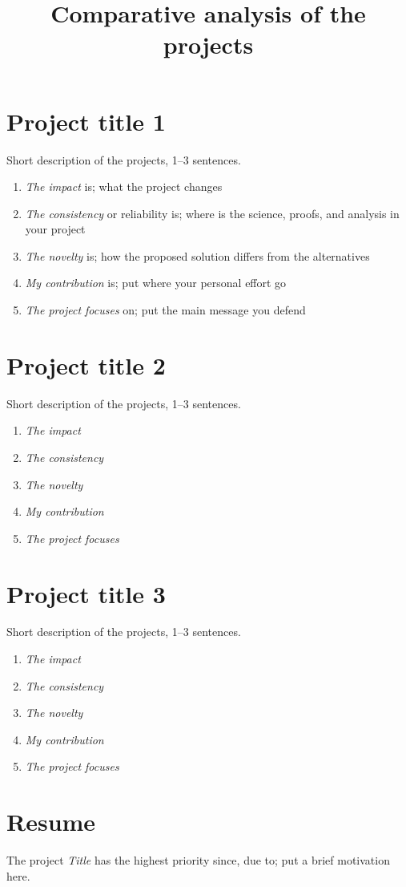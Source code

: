 \documentclass[12pt]{article}
\title{Comparative analysis of the projects}
\date{}
\begin{document}
\maketitle

\section{Project title 1}
Short description of the projects, 1--3 sentences. 
\begin{enumerate}
\item \emph{The impact} is; what the project changes 
\item \emph{The consistency} or reliability is; where is the science, proofs, and analysis in your project
\item \emph{The novelty} is; how the proposed solution differs from the alternatives
\item \emph{My contribution} is; put where your personal effort go
\item \emph{The project focuses} on; put the main message you defend
\end{enumerate}

\section{Project title 2}
Short description of the projects, 1--3 sentences. 
\begin{enumerate}
\item \emph{The impact} 
\item \emph{The consistency} 
\item \emph{The novelty} 
\item \emph{My contribution} 
\item \emph{The project focuses} 
\end{enumerate}

\section{Project title 3}
Short description of the projects, 1--3 sentences. 
\begin{enumerate}
\item \emph{The impact} 
\item \emph{The consistency} 
\item \emph{The novelty} 
\item \emph{My contribution}  
\item \emph{The project focuses}  
\end{enumerate}

\section{Resume}
The project \emph{Title} has the highest priority since, due to; put a brief motivation here. 
\end{document}
